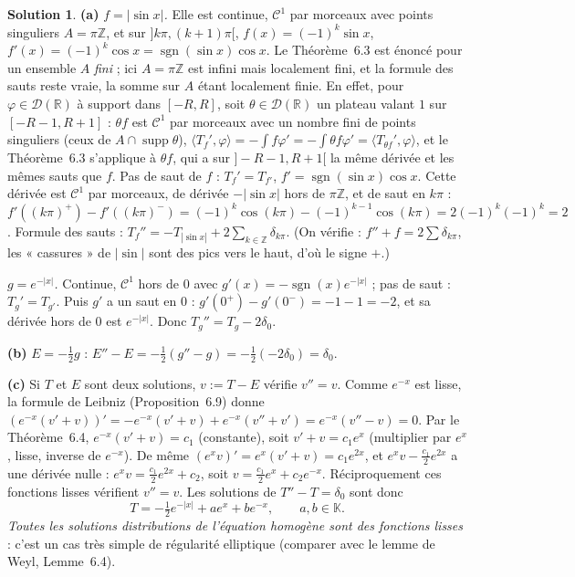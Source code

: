 \documentclass[11pt,a4paper]{article}
\newcommand{\R}{\mathbb{R}}
\newcommand{\Z}{\mathbb{Z}}
\newcommand{\K}{\mathbb{K}}
\DeclareMathOperator{\supp}{supp}
\DeclareMathOperator{\sgn}{sgn}
\newcommand{\D}{\mathcal{D}}
\theoremstyle{definition}
\newtheorem*{solution}{Solution}
\begin{document}
\begin{solution}
\noindent\textbf{(a)} \emph{$f=|\sin x|$.} Elle est continue, $\mathcal C^1$ par morceaux avec points singuliers $A=\pi\Z$, et sur $]k\pi,(k+1)\pi[$, $f(x)=(-1)^k\sin x$, $f'(x)=(-1)^k\cos x=\sgn(\sin x)\cos x$. Le Théorème~6.3 est énoncé pour un ensemble $A$ \emph{fini} ; ici $A=\pi\Z$ est infini mais localement fini, et la formule des sauts reste vraie, la somme sur $A$ étant localement finie. En effet, pour $\varphi\in\D(\R)$ à support dans $[-R,R]$, soit $\theta\in\D(\R)$ un plateau valant $1$ sur $[-R-1,R+1]$ : $\theta f$ est $\mathcal C^1$ par morceaux avec un nombre fini de points singuliers (ceux de $A\cap\supp\theta$), $\langle T_f',\varphi\rangle=-\int f\varphi'=-\int\theta f\varphi'=\langle T_{\theta f}',\varphi\rangle$, et le Théorème~6.3 s'applique à $\theta f$, qui a sur $]-R-1,R+1[$ la même dérivée et les mêmes sauts que $f$. Pas de saut de $f$ : $T_f'=T_{f'}$, $f'=\sgn(\sin x)\cos x$. Cette dérivée est $\mathcal C^1$ par morceaux, de dérivée $-|\sin x|$ hors de $\pi\Z$, et de saut en $k\pi$ : $f'((k\pi)^+)-f'((k\pi)^-)=(-1)^k\cos(k\pi)-(-1)^{k-1}\cos(k\pi)=2(-1)^k(-1)^k=2$. Formule des sauts : $T_f''=-T_{|\sin x|}+2\sum_{k\in\Z}\delta_{k\pi}$. (On vérifie : $f''+f=2\sum\delta_{k\pi}$, les « cassures » de $|\sin|$ sont des pics vers le haut, d'où le signe $+$.)

\emph{$g=e^{-|x|}$.} Continue, $\mathcal C^1$ hors de $0$ avec $g'(x)=-\sgn(x)e^{-|x|}$ ; pas de saut : $T_g'=T_{g'}$. Puis $g'$ a un saut en $0$ : $g'(0^+)-g'(0^-)=-1-1=-2$, et sa dérivée hors de $0$ est $e^{-|x|}$. Donc $T_g''=T_g-2\delta_0$.

\medskip
\noindent\textbf{(b)} $E=-\frac12g$ : $E''-E=-\frac12(g''-g)=-\frac12(-2\delta_0)=\delta_0$.

\medskip
\noindent\textbf{(c)} Si $T$ et $E$ sont deux solutions, $v:=T-E$ vérifie $v''=v$. Comme $e^{-x}$ est lisse, la formule de Leibniz (Proposition~6.9) donne $(e^{-x}(v'+v))'=-e^{-x}(v'+v)+e^{-x}(v''+v')=e^{-x}(v''-v)=0$. Par le Théorème~6.4, $e^{-x}(v'+v)=c_1$ (constante), soit $v'+v=c_1e^x$ (multiplier par $e^x$, lisse, inverse de $e^{-x}$). De même $(e^xv)'=e^x(v'+v)=c_1e^{2x}$, et $e^xv-\frac{c_1}2e^{2x}$ a une dérivée nulle : $e^xv=\frac{c_1}2e^{2x}+c_2$, soit $v=\frac{c_1}2e^x+c_2e^{-x}$. Réciproquement ces fonctions lisses vérifient $v''=v$. Les solutions de $T''-T=\delta_0$ sont donc
\[
T=-\tfrac12e^{-|x|}+ae^x+be^{-x},\qquad a,b\in\K .
\]
\emph{Toutes les solutions distributions de l'équation homogène sont des fonctions lisses} : c'est un cas très simple de régularité elliptique (comparer avec le lemme de Weyl, Lemme~6.4).


\end{solution}
\end{document}
